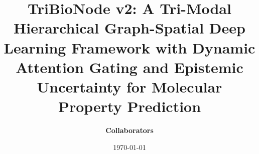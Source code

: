 \documentclass[10pt,twocolumn]{article}
\title{\textbf{\LARGE TriBioNode v2: A Tri-Modal Hierarchical Graph-Spatial Deep Learning Framework with Dynamic Attention Gating and Epistemic Uncertainty for Molecular Property Prediction}}
\author[1]{\textbf{Collaborators}}
\affil[1]{Department of Computer Science and Engineering}
\date{\today}
\begin{document}
\maketitle

\begin{abstract}
\end{abstract}
\end{document}
